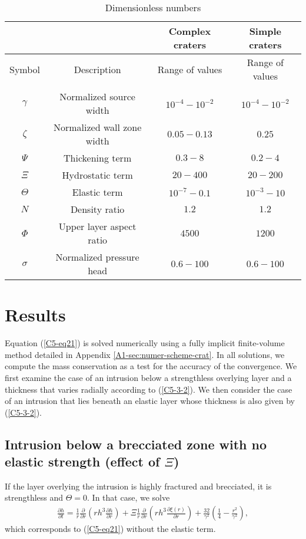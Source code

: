\begin{table}[h!]
  \caption{Dimensionless numbers}
  \centering
  \begin{tabular}{c|c|c|c}
    &&Complex craters&Simple craters \\
    \hline
    Symbol& Description & Range of values & Range of values \\
    \hline
    &&\\
    $\gamma$&Normalized source width& $10^{-4}-10^{-2}$ &$10^{-4}-10^{-2}$ \\
    $\zeta$& Normalized wall zone width  & $0.05-0.13$&$0.25$\\
    $\Psi$&Thickening term & $0.3-8$&$0.2-4$\\
    $\Xi$& Hydrostatic term & $20-400$&$20-200$\\
    $\Theta$ &Elastic term & $10^{-7}-0.1$&$10^{-3}-10$\\
    $N$ & Density ratio & $1.2$ &$1.2$\\
    $\Phi$ & Upper layer aspect ratio & $4500$ &$1200 $\\
    $\sigma$&Normalized pressure head& $0.6-100$ & $0.6-100$ 
                                                   \label{C5-tab3}
  \end{tabular} 
\end{table}
	 
	
\section{Results}
	
Equation (\ref{C5-eq21}) is solved  numerically using a fully implicit
finite-volume        method         detailed        in        Appendix
\ref{A1-sec:numer-scheme-crat}.  In all solutions, we compute the mass
conservation as a  test for the accuracy of the  convergence. We first
examine the case of an  intrusion below a strengthless overlying layer
and a thickness  that varies radially according  to (\ref{C5-3-2}). We
then consider  the case of an  intrusion that lies beneath  an elastic
layer whose thickness is also given by (\ref{C5-3-2}).
	
\subsection{Intrusion below a brecciated zone with no elastic strength
  (effect of $\Xi$)}
\label{C5-Strengthless_Layer1}
If  the  layer  overlying  the   intrusion  is  highly  fractured  and
brecciated, it is strengthless and $\Theta=0$.  In that case, we solve
\begin{eqnarray}
  \label{C5-eq22}
  \frac{\partial h}{\partial t}=\frac{1}{r} \frac{\partial}{\partial r}\left (rh^{3} \frac{\partial h}{\partial r} \right)+ \Xi \frac{1}{r} \frac{\partial}{\partial r}\left ( rh^{3}\frac{\partial \xi(r)}{\partial r}\right )+\frac{32}{\gamma^{2}} \left(\frac{1}{4}-\frac{r^{2}}{\gamma^{2}}\right),
\end{eqnarray}
which corresponds to (\ref{C5-eq21}) without the elastic term.

